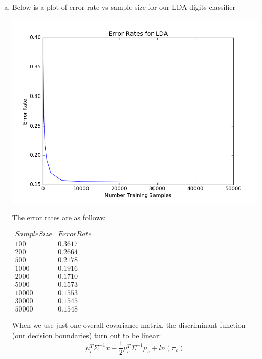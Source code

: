 \documentclass{article}
\begin{document}
\begin{enumerate}[a)]
  \item Below is a plot of error rate vs sample size for our LDA digits classifier
    \begin{center}
      \includegraphics[scale=0.5]{prob5di}
    \end{center}
    The error rates are as follows:
    \begin{center}
      $\begin{array}{c|c}
        Sample Size & Error Rate \\ \hline
        100 &  0.3617\\
        200 &  0.2664\\
        500 &  0.2178\\
        1000 &  0.1916\\
        2000 & 0.1710\\
        5000 & 0.1573\\
        10000 & 0.1553\\
        30000 & 0.1545\\
        50000 & 0.1548
      \end{array}$
    \end{center}
    When we use just one overall covariance matrix, the discriminant function (our decision boundaries) turn out to be linear:
    $$\mu_c^T \Sigma^{-1}x - \frac{1}{2}\mu_c^T\Sigma^{-1}\mu_c + ln(\pi_c)$$


\end{enumerate}
\end{document}
